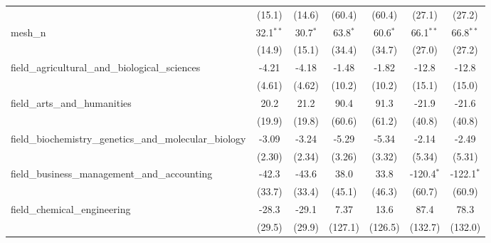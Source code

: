 \begin{tabular}{lcccccc}
                                                               & (15.1)         & (14.6)         & (60.4)         & (60.4)         & (27.1)        & (27.2)\\   
   mesh\_n                                                     & 32.1$^{**}$    & 30.7$^{*}$     & 63.8$^{*}$     & 60.6$^{*}$     & 66.1$^{**}$   & 66.8$^{**}$\\   
                                                               & (14.9)         & (15.1)         & (34.4)         & (34.7)         & (27.0)        & (27.2)\\   
   field\_agricultural\_and\_biological\_sciences              & -4.21          & -4.18          & -1.48          & -1.82          & -12.8         & -12.8\\   
                                                               & (4.61)         & (4.62)         & (10.2)         & (10.2)         & (15.1)        & (15.0)\\   
   field\_arts\_and\_humanities                                & 20.2           & 21.2           & 90.4           & 91.3           & -21.9         & -21.6\\   
                                                               & (19.9)         & (19.8)         & (60.6)         & (61.2)         & (40.8)        & (40.8)\\   
   field\_biochemistry\_genetics\_and\_molecular\_biology      & -3.09          & -3.24          & -5.29          & -5.34          & -2.14         & -2.49\\   
                                                               & (2.30)         & (2.34)         & (3.26)         & (3.32)         & (5.34)        & (5.31)\\   
   field\_business\_management\_and\_accounting                & -42.3          & -43.6          & 38.0           & 33.8           & -120.4$^{*}$  & -122.1$^{*}$\\   
                                                               & (33.7)         & (33.4)         & (45.1)         & (46.3)         & (60.7)        & (60.9)\\   
   field\_chemical\_engineering                                & -28.3          & -29.1          & 7.37           & 13.6           & 87.4          & 78.3\\   
                                                               & (29.5)         & (29.9)         & (127.1)        & (126.5)        & (132.7)       & (132.0)\\   

\end{tabular}
